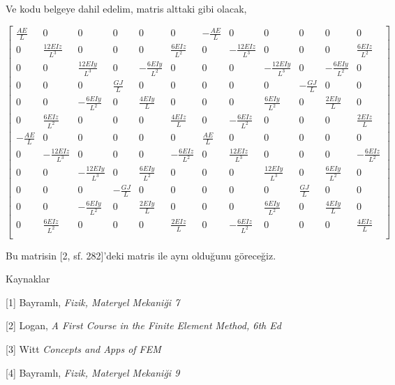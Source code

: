 \documentclass[12pt,fleqn]{article}\usepackage{../../common}
\begin{document}
Ve kodu belgeye dahil edelim, matris alttaki gibi olacak,

$$
\left[\begin{array}{cccccccccccc}
\frac{A E}{L} & 0 & 0 & 0 & 0 & 0 & - \frac{A E}{L} & 0 & 0 & 0 & 0 & 0\\
0 & \frac{12 E Iz}{L^{3}} & 0 & 0 & 0 & \frac{6 E Iz}{L^{2}} & 0 & - \frac{12 E Iz}{L^{3}} & 0 & 0 & 0 & \frac{6 E Iz}{L^{2}}\\
0 & 0 & \frac{12 E Iy}{L^{3}} & 0 & - \frac{6 E Iy}{L^{2}} & 0 & 0 & 0 & - \frac{12 E Iy}{L^{3}} & 0 & - \frac{6 E Iy}{L^{2}} & 0\\
0 & 0 & 0 & \frac{G J}{L} & 0 & 0 & 0 & 0 & 0 & - \frac{G J}{L} & 0 & 0\\
0 & 0 & - \frac{6 E Iy}{L^{2}} & 0 & \frac{4 E Iy}{L} & 0 & 0 & 0 & \frac{6 E Iy}{L^{2}} & 0 & \frac{2 E Iy}{L} & 0\\
0 & \frac{6 E Iz}{L^{2}} & 0 & 0 & 0 & \frac{4 E Iz}{L} & 0 & - \frac{6 E Iz}{L^{2}} & 0 & 0 & 0 & \frac{2 E Iz}{L}\\
- \frac{A E}{L} & 0 & 0 & 0 & 0 & 0 & \frac{A E}{L} & 0 & 0 & 0 & 0 & 0\\
0 & - \frac{12 E Iz}{L^{3}} & 0 & 0 & 0 & - \frac{6 E Iz}{L^{2}} & 0 & \frac{12 E Iz}{L^{3}} & 0 & 0 & 0 & - \frac{6 E Iz}{L^{2}}\\
0 & 0 & - \frac{12 E Iy}{L^{3}} & 0 & \frac{6 E Iy}{L^{2}} & 0 & 0 & 0 & \frac{12 E Iy}{L^{3}} & 0 & \frac{6 E Iy}{L^{2}} & 0\\
0 & 0 & 0 & - \frac{G J}{L} & 0 & 0 & 0 & 0 & 0 & \frac{G J}{L} & 0 & 0\\
0 & 0 & - \frac{6 E Iy}{L^{2}} & 0 & \frac{2 E Iy}{L} & 0 & 0 & 0 & \frac{6 E Iy}{L^{2}} & 0 & \frac{4 E Iy}{L} & 0\\
0 & \frac{6 E Iz}{L^{2}} & 0 & 0 & 0 & \frac{2 E Iz}{L} & 0 & - \frac{6 E Iz}{L^{2}} & 0 & 0 & 0 & \frac{4 E Iz}{L}\\
\end{array}\right]
$$

Bu matrisin [2, sf. 282]'deki matris ile aynı olduğunu göreceğiz.

Kaynaklar

[1] Bayramlı, {\em Fizik, Materyel Mekaniği 7}

[2] Logan, {\em A First Course in the Finite Element Method, 6th Ed}

[3] Witt {\em Concepts and Apps of FEM}

[4] Bayramlı, {\em Fizik, Materyel Mekaniği 9}
\end{document}
